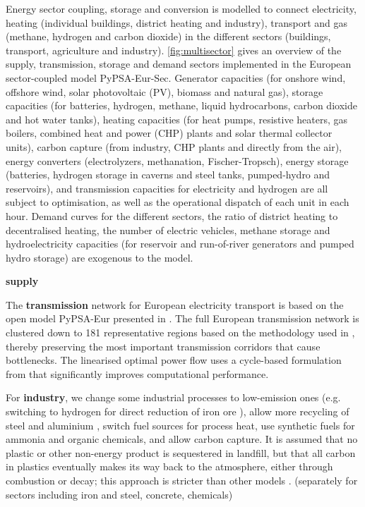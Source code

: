 Energy sector coupling, storage and conversion is modelled to connect
electricity, heating (individual buildings, district heating and industry),
transport and gas (methane, hydrogen and carbon dioxide) in the different
sectors (buildings, transport, agriculture and industry). \cref{fig:multisector}
gives an overview of the supply, transmission, storage and demand sectors
implemented in the European sector-coupled model PyPSA-Eur-Sec. Generator
capacities (for onshore wind, offshore wind, solar photovoltaic (PV), biomass
and natural gas), storage capacities (for batteries, hydrogen, methane, liquid
hydrocarbons, carbon dioxide and hot water tanks), heating capacities (for heat
pumps, resistive heaters, gas boilers, combined heat and power (CHP) plants and
solar thermal collector units), carbon capture (from industry, CHP plants and
directly from the air), energy converters (electrolyzers, methanation,
Fischer-Tropsch), energy storage (batteries, hydrogen storage in caverns and
steel tanks, pumped-hydro and reservoirs), and transmission capacities for
electricity and hydrogen are all subject to optimisation, as well as the
operational dispatch of each unit in each hour. Demand curves for the different
sectors, the ratio of district heating to decentralised heating, the number of
electric vehicles, methane storage and hydroelectricity capacities (for
reservoir and run-of-river generators and pumped hydro storage) are exogenous to
the model.

\textbf{supply}

The \textbf{transmission} network for European electricity transport is based on
the open model PyPSA-Eur presented in \cite{horschPyPSAEurOpen2018}. The full
European transmission network is clustered down to 181 representative regions
based on the methodology used in \cite{Hoersch2017,frysztackiStrongEffect2021},
thereby preserving the most important transmission corridors that cause
bottlenecks. The linearised optimal power flow uses a cycle-based formulation
from \cite{horschLinearOptimal2018} that significantly improves computational
performance.

For \textbf{industry}, we change some industrial processes to low-emission ones (e.g.
switching to hydrogen for direct reduction of iron ore \cite{voglAssessmentHydrogen2018}), allow
more recycling of steel and aluminium \cite{circular_economy}, switch fuel
sources for process heat, use synthetic fuels for ammonia and organic chemicals,
and allow carbon capture. It is assumed that no plastic or other non-energy
product is sequestered in landfill, but that all carbon in plastics eventually
makes its way back to the atmosphere, either through combustion or decay; this
approach is stricter than other models \cite{in-depth_2018}.
(separately for sectors including iron and steel, concrete, chemicals)

